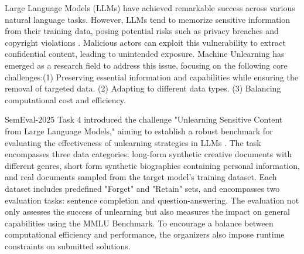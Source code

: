\documentclass[11pt]{article}
\begin{document}
\fi


Large Language Models (LLMs) have achieved remarkable success across various natural language tasks. However, LLMs tend to memorize sensitive information from their training data, posing potential risks such as privacy breaches and copyright violations \cite{wang2024machine}. Malicious actors can exploit this vulnerability to extract confidential content, leading to unintended exposure. Machine Unlearning has emerged as a research field to address this issue, focusing on the following core challenges\cite{qu2023learn, li2025machine}:(1) Preserving essential information and capabilities while ensuring the removal of targeted data. (2) Adapting to different data types. (3) Balancing computational cost and efficiency.


SemEval-2025 Task 4 introduced the challenge "Unlearning Sensitive Content from Large Language Models," aiming to establish a robust benchmark for evaluating the effectiveness of unlearning strategies in LLMs \cite{ramakrishna2025lumellmunlearningmultitask}. The task encompasses three data categories: long-form synthetic creative documents with different genres, short form synthetic biographies containing personal information, and real documents sampled from the target model’s training dataset. Each dataset includes predefined "Forget" and "Retain" sets, and encompasses two evaluation tasks: sentence completion and question-answering. The evaluation not only assesses the success of unlearning but also measures the impact on general capabilities using the MMLU Benchmark. To encourage a balance between computational efficiency and performance, the organizers also impose runtime constraints on submitted solutions.
\end{document}
